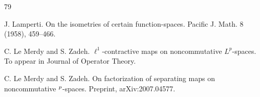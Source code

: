 \documentclass[leqno]{article} %
\let\L\relax
\newcommand{\L}{\mathrm{L}}
\numberwithin{equation}{section}
\begin{document}
\begin{thebibliography}{79}






J. Lamperti.
\newblock On the isometries of certain function-spaces. 
\newblock Pacific J. Math. 8 (1958), 459--466. 

C. Le Merdy and S. Zadeh.
\newblock $\ell^1$-contractive maps on noncommutative $L^p$-spaces.
\newblock To appear in Journal of Operator Theory.

C. Le Merdy and S. Zadeh.
\newblock On factorization of separating maps on noncommutative $\L^p$-spaces.
\newblock Preprint, arXiv:2007.04577.






\end{thebibliography}
\end{document}
